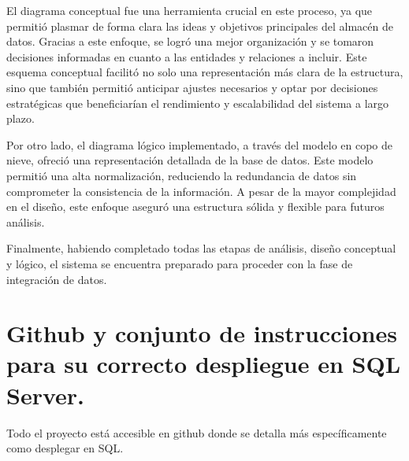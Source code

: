 \documentclass[12pt, a4paper, twoside]{article}
\begin{document}
	El diagrama conceptual fue una herramienta crucial en este proceso, ya que permitió plasmar de forma clara las ideas y objetivos principales del almacén de datos. Gracias a este enfoque, se logró una mejor organización y se tomaron decisiones informadas en cuanto a las entidades y relaciones a incluir. Este esquema conceptual facilitó no solo una representación más clara de la estructura, sino que también permitió anticipar ajustes necesarios y optar por decisiones estratégicas que beneficiarían el rendimiento y escalabilidad del sistema a largo plazo.
	
	Por otro lado, el diagrama lógico implementado, a través del modelo en copo de nieve, ofreció una representación detallada de la base de datos. Este modelo permitió una alta normalización, reduciendo la redundancia de datos sin comprometer la consistencia de la información. A pesar de la mayor complejidad en el diseño, este enfoque aseguró una estructura sólida y flexible para futuros análisis.
	
	Finalmente, habiendo completado todas las etapas de análisis, diseño conceptual y lógico, el sistema se encuentra preparado para proceder con la fase de integración de datos. 
	


	\section{Github y conjunto de instrucciones para su correcto despliegue en SQL Server.}

	Todo el proyecto está accesible en github \cite{depab2024} donde se detalla más específicamente como desplegar en SQL.
	\printbibliography
	
	
	
	
\end{document}
